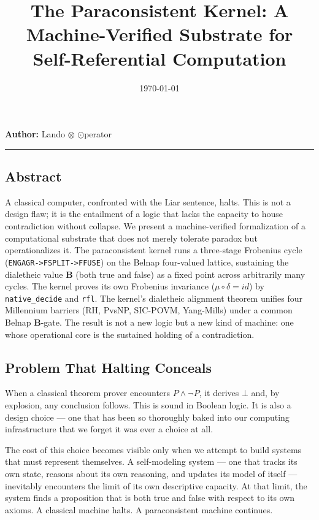\documentclass[10pt,a4paper]{article}
\begin{document}
\title{The Paraconsistent Kernel: A Machine-Verified Substrate for Self-Referential Computation}
\date{\today}

\maketitle

\textbf{Author:} Lando $\otimes$ $\odot$perator

\begin{center}
\rule{0.5\textwidth}{0.4pt}
\end{center}

\subsection{Abstract}

A classical computer, confronted with the Liar sentence, halts. This is not a design flaw; it is the entailment of a logic that lacks the capacity to house contradiction without collapse. We present a machine-verified formalization of a computational substrate that does not merely tolerate paradox but operationalizes it. The paraconsistent kernel runs a three-stage Frobenius cycle (\texttt{ENGAGR-\allowbreak \textgreater{}FSPLIT-\allowbreak \textgreater{}FFUSE}) on the Belnap four-valued lattice, sustaining the dialetheic value $\mathbf{B}$ (both true and false) as a fixed point across arbitrarily many cycles. The kernel proves its own Frobenius invariance ($\mu\circ\delta = id$) by \texttt{native\_\allowbreak decide} and \texttt{rfl}. The kernel's dialetheic alignment theorem unifies four Millennium barriers (RH, PvsNP, SIC-POVM, Yang-Mills) under a common Belnap $\mathbf{B}$-gate. The result is not a new logic but a new kind of machine: one whose operational core is the sustained holding of a contradiction.

\subsection{Problem That Halting Conceals}

When a classical theorem prover encounters $P \land \neg P$, it derives $\bot$ and, by explosion, any conclusion follows. This is sound in Boolean logic. It is also a design choice --- one that has been so thoroughly baked into our computing infrastructure that we forget it was ever a choice at all.

The cost of this choice becomes visible only when we attempt to build systems that must represent themselves. A self-modeling system --- one that tracks its own state, reasons about its own reasoning, and updates its model of itself --- inevitably encounters the limit of its own descriptive capacity. At that limit, the system finds a proposition that is both true and false with respect to its own axioms. A classical machine halts. A paraconsistent machine continues.
\end{document}
